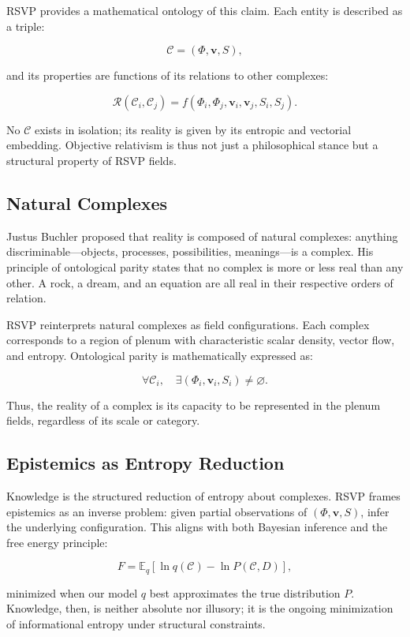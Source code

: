 \documentclass[12pt]{book}
\begin{document}
RSVP provides a mathematical ontology of this claim. Each entity is described as a triple:

\[ \mathcal{C} = (\Phi, \mathbf{v}, S), \]

and its properties are functions of its relations to other complexes:

\[ \mathcal{R}(\mathcal{C}_i, \mathcal{C}_j) = f(\Phi_i, \Phi_j, \mathbf{v}_i, \mathbf{v}_j, S_i, S_j). \]

No \( \mathcal{C} \) exists in isolation; its reality is given by its entropic and vectorial embedding. Objective relativism is thus not just a philosophical stance but a structural property of RSVP fields.

\subsection{Natural Complexes}
Justus Buchler proposed that reality is composed of natural complexes: anything discriminable—objects, processes, possibilities, meanings—is a complex. His principle of ontological parity states that no complex is more or less real than any other. A rock, a dream, and an equation are all real in their respective orders of relation.

RSVP reinterprets natural complexes as field configurations. Each complex corresponds to a region of plenum with characteristic scalar density, vector flow, and entropy. Ontological parity is mathematically expressed as:

\[ \forall \mathcal{C}_i, \quad \exists (\Phi_i, \mathbf{v}_i, S_i) \neq \varnothing. \]

Thus, the reality of a complex is its capacity to be represented in the plenum fields, regardless of its scale or category.

\subsection{Epistemics as Entropy Reduction}
Knowledge is the structured reduction of entropy about complexes. RSVP frames epistemics as an inverse problem: given partial observations of \( (\Phi, \mathbf{v}, S) \), infer the underlying configuration. This aligns with both Bayesian inference and the free energy principle:

\[ F = \mathbb{E}_q[\ln q(\mathcal{C}) - \ln P(\mathcal{C}, D)], \]

minimized when our model \( q \) best approximates the true distribution \( P \). Knowledge, then, is neither absolute nor illusory; it is the ongoing minimization of informational entropy under structural constraints.
\end{document}
